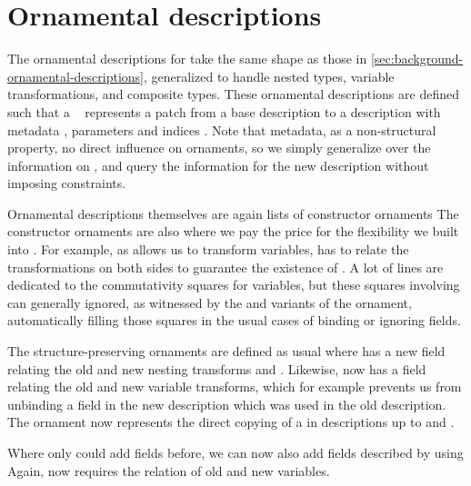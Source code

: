 \section{Ornamental descriptions}
The ornamental descriptions for  take the same shape as those in \autoref{sec:background-ornamental-descriptions}, generalized to handle nested types, variable transformations, and composite types. These ornamental descriptions are defined such that a \  represents a patch from a base description  to a description with metadata , parameters  and indices . Note that metadata, as a non-structural property, no direct influence on ornaments, so we simply generalize over the information on , and query the information for the new description without imposing constraints.

Ornamental descriptions themselves are again lists of constructor ornaments 
The constructor ornaments are also where we pay the price for the flexibility we built into . For example, as  allows us to transform variables,  has to relate the transformations on both sides to guarantee the existence of . A lot of lines are dedicated to the commutativity squares for variables, but these squares involving  can generally ignored, as witnessed by the  and  variants of the  ornament, automatically filling those squares in the usual cases of binding or ignoring fields.

The structure-preserving ornaments are defined as usual
where  has a new field relating the old and new nesting transforms  and . Likewise,  now has a field relating the old and new variable transforms, which for example prevents us from unbinding a field in the new description which was used in the old description. The ornament  now represents the direct copying of a  in descriptions up to  and .

Where only  could add fields before, we can now also add fields described by  using 
Again,  now requires the relation of old and new variables.

